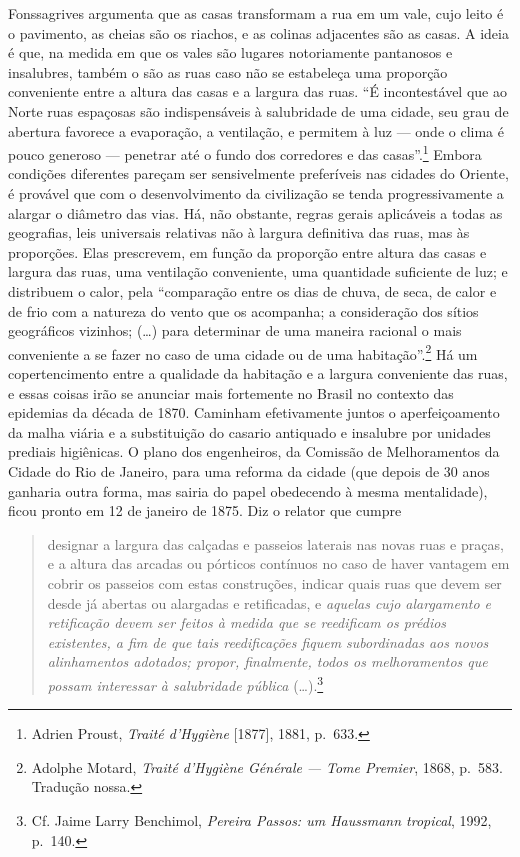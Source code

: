 Fonssagrives argumenta que as casas transformam a rua em um vale, cujo
leito é o pavimento, as cheias são os riachos, e as colinas adjacentes
são as casas. A ideia é que, na medida em que os vales são lugares
notoriamente pantanosos e insalubres, também o são as ruas caso não se
estabeleça uma proporção conveniente entre a altura das casas e a
largura das ruas. ``É incontestável que ao Norte ruas espaçosas são
indispensáveis à salubridade de uma cidade, seu grau de abertura
favorece a evaporação, a ventilação, e permitem à luz --- onde o clima é
pouco generoso --- penetrar até o fundo dos corredores e das
casas''.\footnote{Adrien Proust, \textit{Traité d'Hygiène} {[}1877{]},
  1881, p.~633.} Embora condições diferentes pareçam ser sensivelmente
preferíveis nas cidades do Oriente, é provável que com o desenvolvimento
da civilização se tenda progressivamente a alargar o diâmetro das vias.
Há, não obstante, regras gerais aplicáveis a todas as geografias, leis
universais relativas não à largura definitiva das ruas, mas às
proporções. Elas prescrevem, em função da proporção entre altura das
casas e largura das ruas, uma ventilação conveniente, uma quantidade
suficiente de luz; e distribuem o calor, pela ``comparação entre os dias
de chuva, de seca, de calor e de frio com a natureza do vento que os
acompanha; a consideração dos sítios geográficos vizinhos; (\ldots{})
para determinar de uma maneira racional o mais conveniente a se fazer no
caso de uma cidade ou de uma habitação''.\footnote{Adolphe Motard,
  \textit{Traité d'Hygiène Générale} \textit{--- Tome Premier}, 1868, p.~583.
  Tradução nossa.} Há um copertencimento entre a qualidade da habitação
e a largura conveniente das ruas, e essas coisas irão se anunciar mais
fortemente no Brasil no contexto das epidemias da década de 1870.
Caminham efetivamente juntos o aperfeiçoamento da malha viária e a
substituição do casario antiquado e insalubre por unidades prediais
higiênicas. O plano dos engenheiros, da Comissão de Melhoramentos da
Cidade do Rio de Janeiro, para uma reforma da cidade (que depois de 30
anos ganharia outra forma, mas sairia do papel obedecendo à mesma
mentalidade), ficou pronto em 12 de janeiro de 1875. Diz o relator que
cumpre

\begin{quote}
designar a largura das calçadas e passeios laterais nas novas ruas e
praças, e a altura das arcadas ou pórticos contínuos no caso de haver
vantagem em cobrir os passeios com estas construções, indicar quais ruas
que devem ser desde já abertas ou alargadas e retificadas, e
\textit{aquelas cujo alargamento e retificação devem ser feitos à medida
que se reedificam os prédios existentes, a fim de que tais reedificações
fiquem subordinadas aos novos alinhamentos adotados; propor, finalmente,
todos os melhoramentos que possam interessar à salubridade pública}
(\dots{}).\footnote{Cf. Jaime Larry Benchimol, \textit{Pereira Passos: um
  Haussmann tropical}, 1992, p.~140.}
\end{quote}

